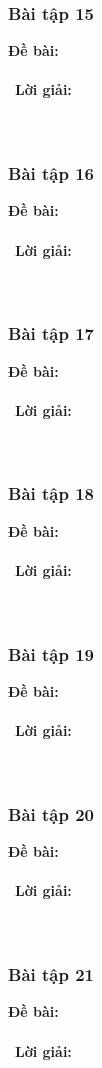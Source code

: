 \documentclass[a4paper]{article}
\begin{document}
\subsubsection{Bài tập 15}
\textbf{Đề bài:} 
\\\ \\\
\textbf{Lời giải:} \\\ \\\
\clearpage
\subsubsection{Bài tập 16}
\textbf{Đề bài:} 
\\\ \\\
\textbf{Lời giải:} \\\ \\\
\clearpage
\subsubsection{Bài tập 17}
\textbf{Đề bài:} 
\\\ \\\
\textbf{Lời giải:} \\\ \\\
\clearpage
\subsubsection{Bài tập 18}
\textbf{Đề bài:} 
\\\ \\\
\textbf{Lời giải:} \\\ \\\
\clearpage
\subsubsection{Bài tập 19}
\textbf{Đề bài:} 
\\\ \\\
\textbf{Lời giải:} \\\ \\\
\clearpage
\subsubsection{Bài tập 20}
\textbf{Đề bài:} 
\\\ \\\
\textbf{Lời giải:} \\\ \\\
\clearpage
\subsubsection{Bài tập 21}
\textbf{Đề bài:} 
\\\ \\\
\textbf{Lời giải:} \\\ \\\
\clearpage
\end{document}
